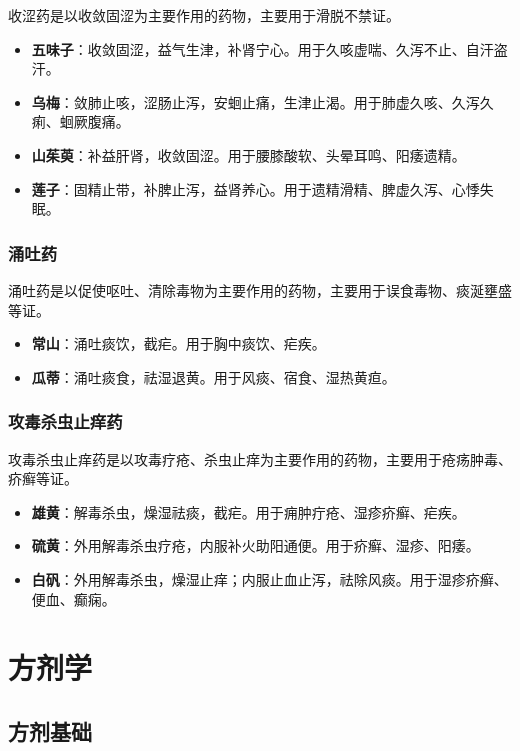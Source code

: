 \documentclass[12pt,UTF8]{ctexbook}
\begin{document}
收涩药是以收敛固涩为主要作用的药物，主要用于滑脱不禁证。

\begin{itemize}
\item \textbf{五味子}：收敛固涩，益气生津，补肾宁心。用于久咳虚喘、久泻不止、自汗盗汗。
\item \textbf{乌梅}：敛肺止咳，涩肠止泻，安蛔止痛，生津止渴。用于肺虚久咳、久泻久痢、蛔厥腹痛。
\item \textbf{山茱萸}：补益肝肾，收敛固涩。用于腰膝酸软、头晕耳鸣、阳痿遗精。
\item \textbf{莲子}：固精止带，补脾止泻，益肾养心。用于遗精滑精、脾虚久泻、心悸失眠。
\end{itemize}

\subsection{涌吐药}

涌吐药是以促使呕吐、清除毒物为主要作用的药物，主要用于误食毒物、痰涎壅盛等证。

\begin{itemize}
\item \textbf{常山}：涌吐痰饮，截疟。用于胸中痰饮、疟疾。
\item \textbf{瓜蒂}：涌吐痰食，祛湿退黄。用于风痰、宿食、湿热黄疸。
\end{itemize}

\subsection{攻毒杀虫止痒药}

攻毒杀虫止痒药是以攻毒疗疮、杀虫止痒为主要作用的药物，主要用于疮疡肿毒、疥癣等证。

\begin{itemize}
\item \textbf{雄黄}：解毒杀虫，燥湿祛痰，截疟。用于痈肿疔疮、湿疹疥癣、疟疾。
\item \textbf{硫黄}：外用解毒杀虫疗疮，内服补火助阳通便。用于疥癣、湿疹、阳痿。
\item \textbf{白矾}：外用解毒杀虫，燥湿止痒；内服止血止泻，祛除风痰。用于湿疹疥癣、便血、癫痫。
\end{itemize}

\chapter{方剂学}

\section{方剂基础}
\end{document}
